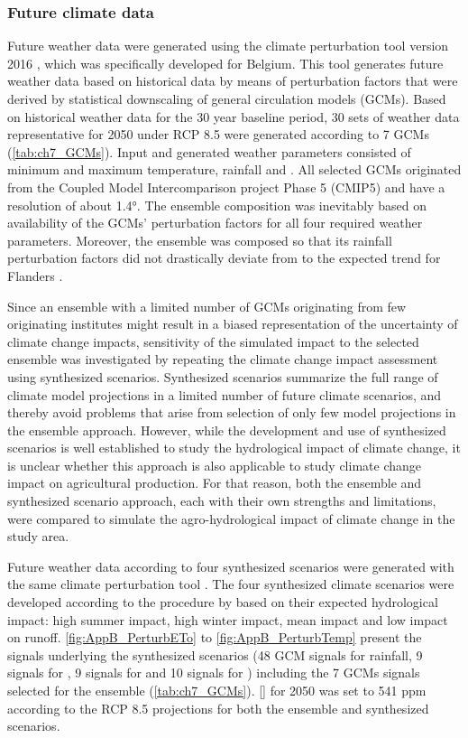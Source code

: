 \subsubsection{Future climate data}
Future weather data were generated using the climate perturbation tool version 2016 \parencite{vanuytven2016}, which was specifically developed for Belgium. This tool generates future weather data based on historical data by means of perturbation factors that were derived by statistical downscaling of general circulation models (GCMs). Based on historical weather data for the 30 year baseline period, 30 sets of weather data representative for 2050 under RCP 8.5 were generated according to 7 GCMs (\autoref{tab:ch7_GCMs}). Input and generated weather parameters consisted of minimum and maximum temperature, rainfall and \ETo. All selected GCMs originated from the Coupled Model Intercomparison project Phase 5 (CMIP5)  \parencite{taylor2012} and have a resolution of about 1.4°. The ensemble composition was inevitably based on availability of the GCMs' perturbation factors for all four required weather parameters. Moreover, the ensemble was composed so that its rainfall perturbation factors did not drastically deviate from to the expected trend for Flanders \parencite{tabari2015}. 

Since an ensemble with a limited number of GCMs originating from few originating institutes might result in a biased representation of the uncertainty of climate change impacts, sensitivity of the simulated impact to the selected ensemble was investigated by repeating the climate change impact assessment using synthesized scenarios. Synthesized scenarios summarize the full range of climate model projections in a limited number of future climate scenarios, and thereby avoid problems that arise from selection of only few model projections in the ensemble approach. However, while the development and use of synthesized scenarios is well established to study the hydrological impact of climate change, it is unclear whether this approach is also applicable to study climate change impact on agricultural production. For that reason, both the ensemble and synthesized scenario approach, each with their own strengths and limitations, were compared to simulate the agro-hydrological impact of climate change in the study area.

Future weather data according to four synthesized scenarios were generated with the same climate perturbation tool \parencite{vanuytven2016}. The four synthesized climate scenarios were developed according to the procedure by \parencite{ntegeka2014} based on their expected hydrological impact: high summer impact, high winter impact, mean impact and low impact on runoff. \autoref{fig:AppB_PerturbETo} to \autoref{fig:AppB_PerturbTemp} present the signals underlying the synthesized scenarios (48 GCM signals for rainfall, 9 signals for \ETo, 9 signals for \Tmin and 10 signals for \Tmax) including the 7 GCMs signals selected for the ensemble (\autoref{tab:ch7_GCMs}). [\COtwo] for 2050 was set to 541 ppm according to the RCP 8.5 projections \parencite{meinshausen2011} for both the ensemble and synthesized scenarios.


